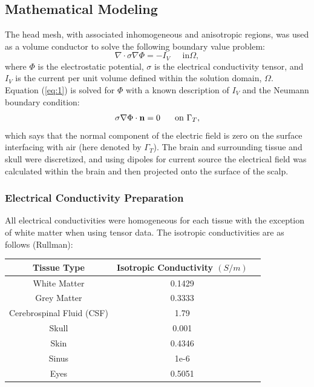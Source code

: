 \subsection{Mathematical Modeling}
\label{sec:math}


The head mesh, with associated inhomogeneous and anisotropic regions, was used as a volume conductor to solve the following boundary value problem:
%
\begin{equation}
\label{eq:1} \nabla\cdot\sigma\nabla\Phi = -I_{V} \;\;\;\;\mbox{ in
}\Omega,
\end{equation} 
%
where $\Phi$ is the electrostatic potential, $\sigma$ is the electrical conductivity tensor, and $I_{V}$ is the current per unit volume defined within the solution domain, $\Omega$. Equation (\ref{eq:1}) is solved for $\Phi$ with a known description of $I_{V}$ and the Neumann boundary condition:
%
\begin{equation} \sigma\nabla\Phi\cdot{\bf
n} = 0\;\;\;\;\;\mbox{ on }\Gamma_{T}, 
\end{equation} 
%
which says that the normal component of the electric field is zero on the surface interfacing with air (here denoted by $\Gamma_{T}$). The brain and surrounding tissue and skull were discretized, and using dipoles for current source the electrical field was calculated within the brain and then projected onto the surface of the scalp.

\subsubsection{Electrical Conductivity Preparation} 

All electrical conductivities were homogeneous for each tissue with the exception of white matter when using tensor data. The isotropic conductivities are as follows (Rullman): 

\begin{center}
\begin{tabular}{ |c|c|c| } 
 \hline
Tissue Type & Isotropic Conductivity $(S/m)$\\ 
 \hline
 \hline
 White Matter & 0.1429\\ 
 \hline
 Grey Matter & 0.3333 \\ 
 \hline
 Cerebrospinal Fluid (CSF) & 1.79\\
 \hline
Skull & 0.001\\
 \hline
 Skin & 0.4346\\
 \hline
 Sinus & 1e-6\\
 \hline
 Eyes & 0.5051\\
 \hline
\end{tabular}
\end{center}

